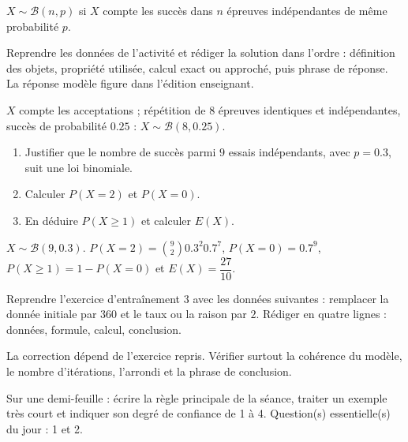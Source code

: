 \begin{summary}$X\sim\mathcal B(n,p)$ si $X$ compte les succès dans $n$ épreuves indépendantes de même probabilité $p$.\end{summary}

\begin{example}
Reprendre les données de l'activité et rédiger la solution dans l'ordre : définition des objets, propriété utilisée, calcul exact ou approché, puis phrase de réponse. La réponse modèle figure dans l'édition enseignant.
\end{example}
\begin{solution}$X$ compte les acceptations ; répétition de 8 épreuves identiques et indépendantes, succès de probabilité $\num{0,25}$ : $X\sim\mathcal B(8,\num{0,25})$.\end{solution}

\begin{exercise}[essentiel]
\begin{enumerate}\item Justifier que le nombre de succès parmi $9$ essais indépendants, avec $p=\num{0,3}$, suit une loi binomiale.\item Calculer $P(X=2)$ et $P(X=0)$.\item En déduire $P(X\geq1)$ et calculer $E(X)$.\end{enumerate}
\end{exercise}
\begin{solution}$X\sim\mathcal B(9,\num{0,3})$. $P(X=2)=\binom{9}2 \num{0,3}^2 \num{0,7}^{7}$, $P(X=0)=\num{0,7}^{9}$, $P(X\geq1)=1-P(X=0)$ et $E(X)=\dfrac{27}{10}$.\end{solution}


\begin{homework}Reprendre l'exercice d'entraînement 3 avec les données suivantes : remplacer la donnée initiale par $360$ et le taux ou la raison par $2$. Rédiger en quatre lignes : données, formule, calcul, conclusion.\end{homework}
\begin{solution}La correction dépend de l'exercice repris. Vérifier surtout la cohérence du modèle, le nombre d'itérations, l'arrondi et la phrase de conclusion.\end{solution}

\begin{exitticket}[3 minutes]Sur une demi-feuille : écrire la règle principale de la séance, traiter un exemple très court et indiquer son degré de confiance de 1 à 4. Question(s) essentielle(s) du jour : 1 et 2.\end{exitticket}

